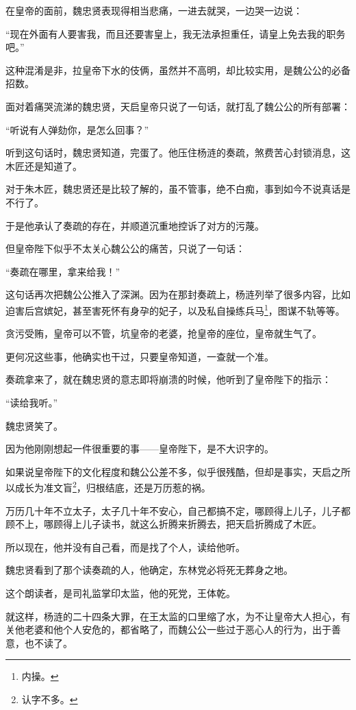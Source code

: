 \begin{multicols}{\theparacolNo}
		在皇帝的面前，魏忠贤表现得相当悲痛，一进去就哭，一边哭一边说：

		“现在外面有人要害我，而且还要害皇上，我无法承担重任，请皇上免去我的职务吧。”

		这种混淆是非，拉皇帝下水的伎俩，虽然并不高明，却比较实用，是魏公公的必备招数。

		面对着痛哭流涕的魏忠贤，天启皇帝只说了一句话，就打乱了魏公公的所有部署：

		“听说有人弹劾你，是怎么回事？”

		听到这句话时，魏忠贤知道，完蛋了。他压住杨涟的奏疏，煞费苦心封锁消息，这木匠还是知道了。

		对于朱木匠，魏忠贤还是比较了解的，虽不管事，绝不白痴，事到如今不说真话是不行了。

		于是他承认了奏疏的存在，并顺道沉重地控诉了对方的污蔑。

		但皇帝陛下似乎不太关心魏公公的痛苦，只说了一句话：

		“奏疏在哪里，拿来给我！”

		这句话再次把魏公公推入了深渊。因为在那封奏疏上，杨涟列举了很多内容，比如迫害后宫嫔妃，甚至害死怀有身孕的妃子，以及私自操练兵马\footnote{内操。}，图谋不轨等等。

		贪污受贿，皇帝可以不管，坑皇帝的老婆，抢皇帝的座位，皇帝就生气了。

		更何况这些事，他确实也干过，只要皇帝知道，一查就一个准。

		奏疏拿来了，就在魏忠贤的意志即将崩溃的时候，他听到了皇帝陛下的指示：

		“读给我听。”

		魏忠贤笑了。

		因为他刚刚想起一件很重要的事——皇帝陛下，是不大识字的。

		如果说皇帝陛下的文化程度和魏公公差不多，似乎很残酷，但却是事实，天启之所以成长为准文盲\footnote{认字不多。}，归根结底，还是万历惹的祸。

		万历几十年不立太子，太子几十年不安心，自己都搞不定，哪顾得上儿子，儿子都顾不上，哪顾得上儿子读书，就这么折腾来折腾去，把天启折腾成了木匠。

		所以现在，他并没有自己看，而是找了个人，读给他听。

		魏忠贤看到了那个读奏疏的人，他确定，东林党必将死无葬身之地。

		这个朗读者，是司礼监掌印太监，他的死党，王体乾。

		就这样，杨涟的二十四条大罪，在王太监的口里缩了水，为不让皇帝大人担心，有关他老婆和他个人安危的，都省略了，而魏公公一些过于恶心人的行为，出于善意，也不读了。


\end{multicols}
